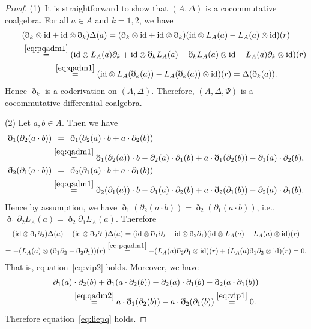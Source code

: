 \documentclass[10pt,a4paper]{amsart}
\numberwithin{equation}{section}
\newcommand{\id}{\mathrm{id}}
\begin{document}
\begin{proof} (1)~It is straightforward to show that $(A, \Delta)$ is a cocommutative coalgebra.
 For all $a \in A$ and $k=1, 2$, we have
 \begin{gather*}
 (\eth_k \otimes \id + \id \otimes \eth_k)\Delta(a) = (\eth_k \otimes \id + \id \otimes \eth_k)(\id \otimes L_A(a) - L_A(a) \otimes \id )(r) \\
 \qquad{} \overset{\eqref{eq:pqadm1}}{=} (\id \otimes L_A(a) \partial_k + \id \otimes \eth_k L_A(a) - \eth_k L_A(a) \otimes \id - L_A(a) \partial_k \otimes \id ) (r) \\
\qquad{} \;\overset{\eqref{eq:qadm1}}{=} (\id \otimes L_A(\eth_k(a)) - L_A(\eth_k(a)) \otimes \id ) (r) = \Delta(\eth_k(a)).
	\end{gather*}
 Hence $\eth_k$ is a coderivation on $(A, \Delta)$.
 Therefore, $(A, \Delta, \Psi)$ is a cocommutative differential coalgebra.

 (2)
 Let $a, b \in A$. Then we have
 \begin{align*}
 \eth_1(\partial_2(a \cdot b)) &\overset{\hphantom{(0.0)}}{=} \eth_1(\partial_2(a) \cdot b + a \cdot \partial_2(b)) \\
 &\overset{\eqref{eq:qadm1}}{=} \eth_1(\partial_2(a)) \cdot b - \partial_2(a) \cdot \partial_1(b) + a \cdot \eth_1(\partial_2(b)) - \partial_1(a) \cdot \partial_2(b), \\
 \eth_2(\partial_1(a \cdot b)) &\overset{\hphantom{(0.0)}}{=} \eth_2(\partial_1(a) \cdot b + a \cdot \partial_1(b)) \\
 &\overset{\eqref{eq:qadm1}}{=} \eth_2(\partial_1(a)) \cdot b - \partial_1(a) \cdot \partial_2(b) + a \cdot \eth_2(\partial_1(b)) - \partial_2(a) \cdot \partial_1(b).
 \end{align*}
 Hence by assumption, we have
 $\eth_1(\partial_2(a \cdot b)) = \eth_2(\partial_1(a \cdot b))$, i.e.,
 $\eth_1 \partial_2 L_A(a) = \eth_2 \partial_1 L_A(a)$.
 Therefore
 \begin{gather*}
 (\id \otimes \eth_1 \partial_2)\Delta(a) - (\id \otimes \eth_2 \partial_1)\Delta(a) = (\id \otimes \eth_1 \partial_2 - \id \otimes \eth_2 \partial_1)(\id \otimes L_A(a) - L_A(a) \otimes \id )(r) \\
 = - (L_A(a) \otimes (\eth_1 \partial_2 - \eth_2 \partial_1) )(r) \overset{\eqref{eq:pqadm1}}{=} - (L_A(a) \eth_2 \partial_1 \otimes \id )(r) + (L_A(a) \eth_1 \partial_2 \otimes \id)(r) = 0.
	\end{gather*}
 That is, equation~\eqref{eq:vip2} holds. Moreover, we have
 \begin{gather*}
 \partial_1(a) \cdot \partial_2(b) + \eth_1(a \cdot \partial_2(b)) - \partial_2(a) \cdot \partial_1(b) - \eth_2(a \cdot \partial_1(b))\\
 \qquad{} \overset{\eqref{eq:qadm2}}{=} a \cdot \eth_1(\partial_2(b)) - a \cdot \eth_2(\partial_1(b)) \overset{\eqref{eq:vip1}}{=} 0.
 \end{gather*}
 Therefore equation~\eqref{eq:liepq} holds.
\end{proof}
\end{document}
